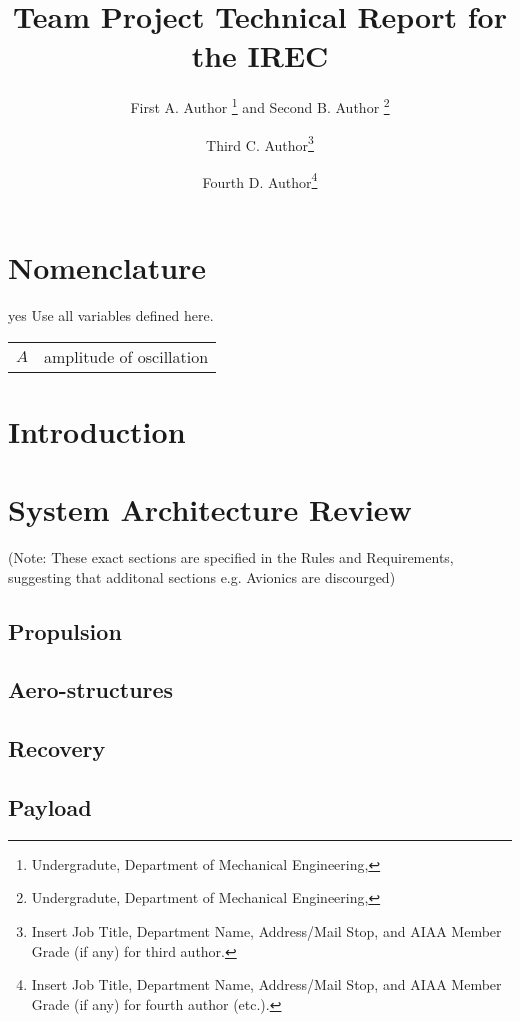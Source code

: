 \documentclass[conf]{lib/new-aiaa}
\title{Team \irecteam{} Project Technical Report for the \irecyear{} IREC}
\author{
	First A. Author
	\footnote{Undergradute, Department of Mechanical Engineering, \RITAddr} and 
	Second B. Author
	\footnote{Undergradute, Department of Mechanical Engineering, \RITAddr}
}
\affil{\RIT, \RITAddr}
\author{Third C. Author\footnote{Insert Job Title, Department Name, Address/Mail Stop, and AIAA Member Grade (if any) for third author.}}
\affil{\RIT, \RITAddr}
\author{Fourth D. Author\footnote{Insert Job Title, Department Name, Address/Mail Stop, and AIAA Member Grade (if any) for fourth author (etc.).}}
\affil{\RIT, \RITAddr}
\def\WIP{yes}
\begin{document}
\maketitle

\begin{abstract}
	\AbstractDescription{}
\end{abstract}

\section{Nomenclature}
\ifdefined\WIP
Use all variables defined here.
\fi

{\renewcommand\arraystretch{1.0}
\noindent\begin{longtable*}{@{}l @{\quad=\quad} l@{}}
	\(A\) & amplitude of oscillation \\
\end{longtable*}}

\pagebreak
\section{Introduction}
\begin{quotation}
\IntroductionDescription
\end{quotation}

\section{System Architecture Review}
\begin{quotation}
\SAODescription
\end{quotation}

(Note: These exact sections are specified in the Rules and Requirements,
suggesting that additonal sections e.g. Avionics are discourged)

\subsection{Propulsion}

\subsection{Aero-structures}

\subsection{Recovery}

\subsection{Payload}
\end{document}
